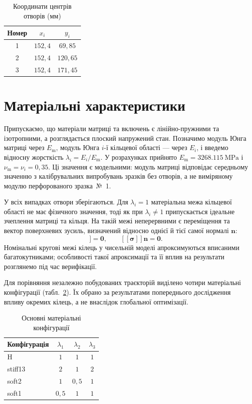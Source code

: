 \begin{table}[htbp]
\centering
\caption{Координати центрів отворів (мм)}
\label{tab:hole-centres}
\begin{tabular}{ccc}
\toprule
Номер & $x_i$ & $y_i$\\
\midrule
1 & $152{,}4$ & $69{,}85$\\
2 & $152{,}4$ & $120{,}65$\\
3 & $152{,}4$ & $171{,}45$\\
\bottomrule
\end{tabular}
\end{table}

\section{Матеріальні характеристики}
Припускаємо, що матеріали матриці та включень є лінійно-пружними та ізотропними, а розглядається плоский напружений стан. Позначимо модуль Юнга матриці через $E_{\mathrm{m}}$, модуль Юнга $i$-ї кільцевої області --- через $E_i$, і введемо відносну жорсткість $\lambda_i=E_i/E_{\mathrm{m}}$. У розрахунках прийнято $E_{\mathrm{m}}=\qty{3268.115}{\mega\pascal}$ і $\nu_{\mathrm{m}}=\nu_i=0{,}35$. Ці значення є модельними: модуль матриці відповідає середньому значенню з калібрувальних випробувань зразків без отворів, а не виміряному модулю перфорованого зразка~№~1.

У всіх випадках отвори зберігаються. Для $\lambda_i=1$ матеріальна межа кільцевої області не має фізичного значення, тоді як при $\lambda_i\ne1$ припускається ідеальне зчеплення матриці та кільця. На такій межі неперервними є переміщення та вектор поверхневих зусиль, визначений відносно однієї й тієї самої нормалі $\boldsymbol n$:
\begin{equation}
 [\![\boldsymbol u]\!]=\boldsymbol 0,\qquad
 [\![\boldsymbol\sigma]\!]\boldsymbol n=\boldsymbol 0.
 \label{eq:perfect-bond}
\end{equation}
Номінальні кругові межі кілець у чисельній моделі апроксимуються вписаними багатокутниками; особливості такої апроксимації та її вплив на результати розглянемо під час верифікації.

Для порівняння незалежно побудованих траєкторій виділено чотири матеріальні конфігурації (табл.~\ref{tab:architectures}). Їх обрано за результатами попереднього дослідження впливу окремих кілець, а не внаслідок глобальної оптимізації.

\begin{table}[htbp]
\centering
\caption{Основні матеріальні конфігурації}
\label{tab:architectures}
\begin{tabular}{lccc}
\toprule
Конфігурація & $\lambda_1$ & $\lambda_2$ & $\lambda_3$\\
\midrule
H & $1$ & $1$ & $1$\\
stiff13 & $2$ & $1$ & $2$\\
soft2 & $1$ & $0{,}5$ & $1$\\
soft1 & $0{,}5$ & $1$ & $1$\\
\bottomrule
\end{tabular}
\end{table}

